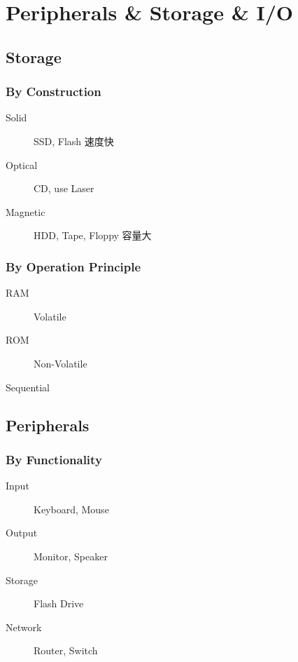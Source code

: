 \documentclass[11pt,journal,compsoc]{IEEEtran}
\begin{document}
\section{Peripherals \& Storage \& I/O}


\subsection{Storage}

\subsubsection{By Construction}

\begin{description}
    \item[Solid] SSD, Flash 速度快

    \item[Optical] CD, use Laser

    \item[Magnetic] HDD, Tape, Floppy 容量大
\end{description}

\subsubsection{By Operation Principle}

\begin{description}
    \item[RAM] Volatile
    \item[ROM] Non-Volatile
    \item[Sequential]
\end{description}


\subsection{Peripherals}

\subsubsection{By Functionality}

\begin{description}
    \item[Input] Keyboard, Mouse
    
    \item[Output] Monitor, Speaker

    \item[Storage] Flash Drive

    \item[Network] Router, Switch
\end{description}
\end{document}
